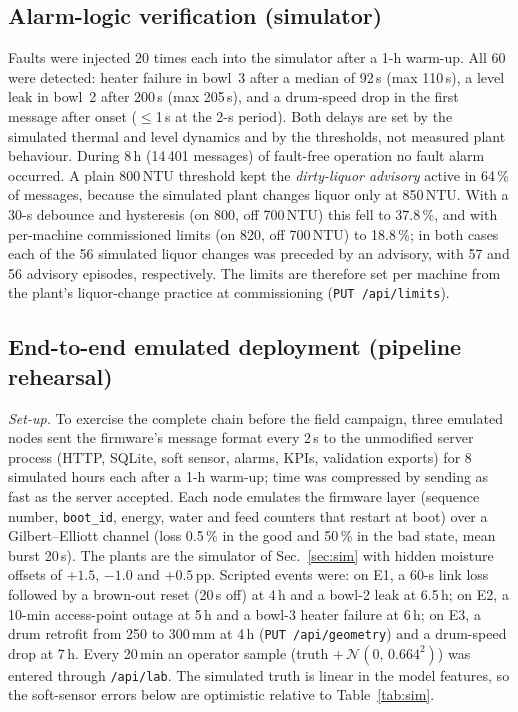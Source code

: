 \documentclass[journal]{IEEEtran}
\begin{document}
\subsection{Alarm-logic verification (simulator)}
Faults were injected 20 times each into the simulator after a 1-h warm-up. All 60 were detected: heater failure in bowl~3
after a median of 92\,s (max 110\,s), a level leak in bowl~2 after 200\,s (max 205\,s), and a drum-speed drop in the first
message after onset ($\le$1\,s at the 2-s period). Both delays are set by the simulated thermal and level dynamics and by the thresholds, not measured
plant behaviour. During 8\,h (14\,401 messages) of fault-free operation no fault alarm occurred. A plain 800\,NTU
threshold kept the \emph{dirty-liquor advisory} active in 64\,\% of messages, because the simulated plant changes
liquor only at 850\,NTU. With a 30-s debounce and hysteresis (on 800, off 700\,NTU) this fell to 37.8\,\%, and with
per-machine commissioned limits (on 820, off 700\,NTU) to 18.8\,\%; in both cases each of the 56 simulated liquor
changes was preceded by an advisory, with 57 and 56 advisory episodes, respectively. The limits are therefore set per
machine from the plant's liquor-change practice at commissioning (\texttt{PUT /api/limits}).

\subsection{End-to-end emulated deployment (pipeline rehearsal)}
\label{sec:e2e}
\emph{Set-up.} To exercise the complete chain before the field campaign, three emulated nodes sent the firmware's
message format every 2\,s to the unmodified server process (HTTP, SQLite, soft sensor, alarms, KPIs, validation
exports) for 8 simulated hours each after a 1-h warm-up; time was compressed by sending as fast as the server
accepted. Each node emulates the firmware layer (sequence number, \texttt{boot\_id}, energy, water and feed counters
that restart at boot) over a Gilbert--Elliott channel (loss 0.5\,\% in the good and 50\,\% in the bad state, mean
burst 20\,s). The plants are the simulator of Sec.~\ref{sec:sim} with hidden moisture offsets of $+1.5$, $-1.0$ and
$+0.5$\,pp. Scripted events were: on E1, a 60-s link loss followed by a brown-out reset (20\,s off) at 4\,h and a
bowl-2 leak at 6.5\,h; on E2, a 10-min access-point outage at 5\,h and a bowl-3 heater failure at 6\,h; on E3, a drum
retrofit from 250 to 300\,mm at 4\,h (\texttt{PUT /api/geometry}) and a drum-speed drop at 7\,h. Every 20\,min an
operator sample (truth $+\,\mathcal N(0,\,0.664^2)$) was entered through \texttt{/api/lab}. The simulated truth is
linear in the model features, so the soft-sensor errors below are optimistic relative to Table~\ref{tab:sim}.
\end{document}
